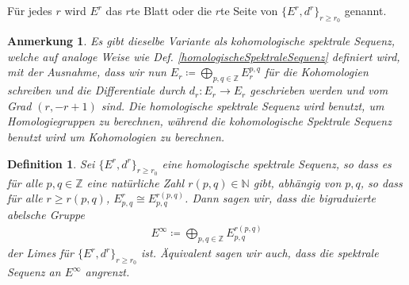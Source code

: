 \documentclass[12pt, hidelinks]{article}
\numberwithin{conj}{section}
\newtheorem{definition}[conj]{Definition}
\newtheorem{remark}[conj]{Anmerkung}
\newcommand{\Z}{\mathbb{Z}}
\begin{document}
Für jedes $r$ wird $E^r$ das $r$te Blatt oder die $r$te Seite von $\{E^r,d^r\}_{r \geq r_0}$ genannt.

\begin{remark}
    Es gibt dieselbe Variante als kohomologische spektrale Sequenz, welche auf analoge Weise wie Def. \ref{homologischeSpektraleSequenz} definiert wird, mit der Ausnahme, dass wir nun $E_r \coloneq \bigoplus_{p,q \in \Z} E^{p,q}_r$ für die Kohomologien schreiben und die Differentiale durch $d_r: E_r \to E_r$ geschrieben werden und vom Grad $(r,-r+1)$ sind. Die homologische spektrale Sequenz wird benutzt, um Homologiegruppen zu berechnen, während die kohomologische Spektrale Sequenz benutzt wird um Kohomologien zu berechnen.
\end{remark}

\begin{definition}
    Sei $\{E^r, d^r\}_{r \geq r_0}$ eine homologische spektrale Sequenz, so dass es für alle $p,q \in \Z$ eine natürliche Zahl $r(p,q) \in \mathbb{N}$ gibt, abhängig von $p,q$, so dass für alle $r \geq r(p,q)$, $E^r_{p,q} \cong E_{p,q}^{r(p,q)}$. Dann sagen wir, dass die bigraduierte abelsche Gruppe
    \begin{align}
        E^\infty \coloneq \bigoplus_{p,q \in \Z} E^{r(p,q)}_{p,q}
    \end{align}
    der Limes für $\{E^r, d^r\}_{r \geq r_0}$ ist. Äquivalent sagen wir auch, dass die spektrale Sequenz an $E^\infty$ angrenzt.
\end{definition}
\end{document}
